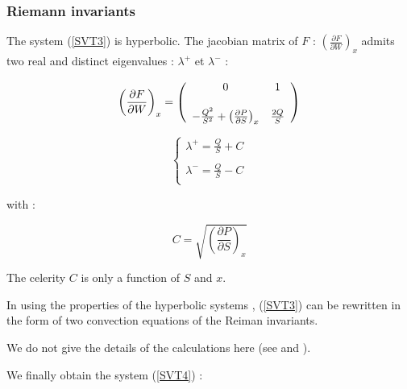 \subsubsection{Riemann invariants}

The system (\ref{SVT3}) is hyperbolic. The jacobian matrix of $F$ : $\left ( \frac{\partial F}{\partial W} \right )_x$  admits two real and distinct eigenvalues : $\lambda^+$ et $\lambda^-$ :

\begin{equation}
 \left ( \frac{\partial F}{\partial W} \right )_x = \left ( 
    \begin{array}{c c}
    0 & 1\\
    \\
    -\frac{Q^2}{S^2} + \left ( \frac{\partial P}{\partial S} \right )_x & \frac{2 Q}{S}
\end{array}
\right )
\end{equation}

\begin{equation}
 \left \lbrace
  \begin{array}{l}
    \lambda^+ = \frac{Q}{S} + C \\
    \\
    \lambda^- = \frac{Q}{S} - C \\
  \end{array}
 \right.
\end{equation}

with :

\begin{equation}
 C = \sqrt{\left ( \frac{\partial P}{\partial S} \right )_x}
\end{equation}

\vspace{0.5cm}

The celerity $C$ is only a function of $S$ and $x$.

\vspace{0.5cm}

In using the properties of the hyperbolic systems \cite{GODLEWSKI91}\cite{AFIF86}, (\ref{SVT3}) can be rewritten in the form of two convection equations of the Reiman invariants.

\vspace{0.5cm}

We do not give the details of the calculations here (see \cite{GODLEWSKI91} and \cite{AFIF86}).

\vspace{0.5cm}

We finally obtain the system (\ref{SVT4}) :

